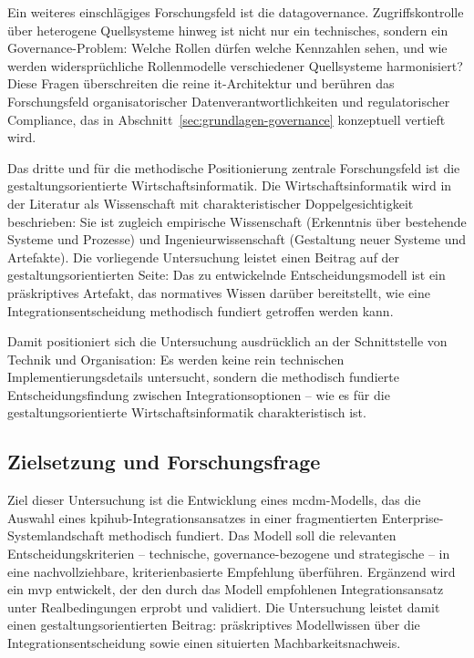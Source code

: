 Ein weiteres einschlägiges Forschungsfeld ist die \gls{datagovernance}.
Zugriffskontrolle über heterogene Quellsysteme hinweg ist nicht nur ein technisches, sondern ein Governance-Problem: Welche Rollen dürfen welche Kennzahlen sehen, und wie werden widersprüchliche Rollenmodelle verschiedener Quellsysteme harmonisiert?
Diese Fragen überschreiten die reine \gls{it}-Architektur und berühren das Forschungsfeld organisatorischer Datenverantwortlichkeiten und regulatorischer Compliance, das in Abschnitt~\ref{sec:grundlagen-governance} konzeptuell vertieft wird.

Das dritte und für die methodische Positionierung zentrale Forschungsfeld ist die gestaltungsorientierte Wirtschaftsinformatik.
Die Wirtschaftsinformatik wird in der Literatur als Wissenschaft mit charakteristischer Doppelgesichtigkeit beschrieben: Sie ist zugleich empirische Wissenschaft (Erkenntnis über bestehende Systeme und Prozesse) und Ingenieurwissenschaft (Gestaltung neuer Systeme und Artefakte).
Die vorliegende Untersuchung leistet einen Beitrag auf der gestaltungsorientierten Seite: Das zu entwickelnde Entscheidungsmodell ist ein präskriptives Artefakt, das normatives Wissen darüber bereitstellt, wie eine Integrationsentscheidung methodisch fundiert getroffen werden kann.

Damit positioniert sich die Untersuchung ausdrücklich an der Schnittstelle von Technik und Organisation: Es werden keine rein technischen Implementierungsdetails untersucht, sondern die methodisch fundierte Entscheidungsfindung zwischen Integrationsoptionen -- wie es für die gestaltungsorientierte Wirtschaftsinformatik charakteristisch ist.


\subsection{Zielsetzung und Forschungsfrage}
\label{sec:einleitung-zielsetzung}

Ziel dieser Untersuchung ist die Entwicklung eines \gls{mcdm}-Modells, das die Auswahl eines \gls{kpihub}-Integrationsansatzes in einer fragmentierten Enterprise-Systemlandschaft methodisch fundiert.
Das Modell soll die relevanten Entscheidungskriterien -- technische, governance-bezogene und strategische -- in eine nachvollziehbare, kriterienbasierte Empfehlung überführen.
Ergänzend wird ein \gls{mvp} entwickelt, der den durch das Modell empfohlenen Integrationsansatz unter Realbedingungen erprobt und validiert.
Die Untersuchung leistet damit einen gestaltungsorientierten Beitrag: präskriptives Modellwissen über die Integrationsentscheidung sowie einen situierten Machbarkeitsnachweis.

